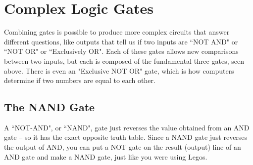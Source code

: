 \clearpage
\newpage

\section{Complex Logic Gates}

Combining gates is possible to produce more complex circuits that answer different questions, like outputs that tell us if two inputs are ``NOT AND" or ``NOT OR" or ``Exclusively OR". Each of these gates allows new comparisons between two inputs, but each is composed of the fundamental three gates, seen above. There is even an "Exclusive NOT OR" gate, which is how computers determine if two numbers are equal to each other.

\subsection*{The NAND Gate}

A ``NOT-AND", or ``NAND", gate just reverses the value obtained from an AND gate -- so it has the exact opposite truth table. Since a NAND gate just reverses the output of AND, you can put a NOT gate on the result (output) line of an AND gate and make a NAND gate, just like you were using Legos.


